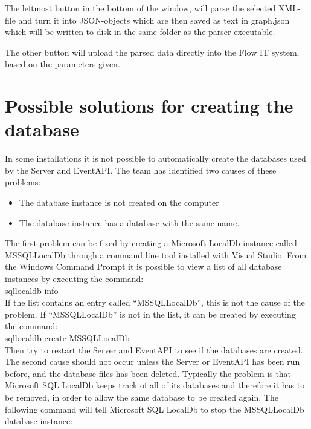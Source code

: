 The leftmost button in the bottom of the window, will parse the selected XML-file and turn it into JSON-objects which are then saved as text in graph.json which will be written to disk in the same folder as the parser-executable.

The other button will upload the parsed data directly into the Flow IT system, based on the parameters given.



\section{Possible solutions for creating the database \label{sec:SolutionsForCreatingTheDatabaseAppendix}}
In some installations it is not possible to automatically create the databases used by the Server and EventAPI. The team has identified two causes of these problems:
\begin{itemize}
\item The database instance is not created on the computer
\item The database instance has a database with the same name.
\end{itemize}


The first problem can be fixed by creating a Microsoft LocalDb instance called MSSQLLocalDb through a command line tool installed with Visual Studio.
From the Windows Command Prompt it is possible to view a list of all database instances by executing the command:\\

\indent	sqllocaldb info\\

If the list contains an entry called “MSSQLLocalDb”, this is not the cause of the problem. If “MSSQLLocalDb” is not in the list, it can be created by executing the command:\\

\indent	sqllocaldb create MSSQLLocalDb\\

Then try to restart the Server and EventAPI to see if the databases are created.\\



The second cause should not occur unless the Server or EventAPI has been run before, and the database files has been deleted. Typically the problem is that Microsoft SQL LocalDb keeps track of all of its databases and therefore it has to be removed, in order to allow the same database to be created again. The following command will tell Microsoft SQL LocalDb to stop the MSSQLLocalDb database instance:\\

